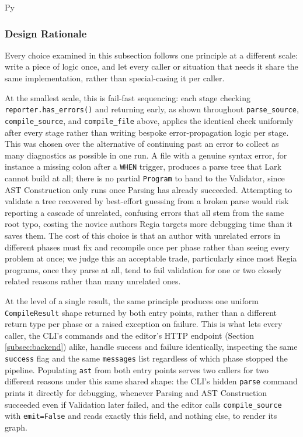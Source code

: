 \begin{codeblock}[]{Py}
\subsubsection{Design Rationale}
Every choice examined in this subsection follows one principle at a different scale: write a piece of logic once, and let every caller or situation that needs it share the same implementation, rather than special-casing it per caller.

At the smallest scale, this is fail-fast sequencing: each stage checking \lstinline|reporter.has_errors()| and returning early, as shown throughout \lstinline|parse_source|, \lstinline|compile_source|, and \lstinline|compile_file| above, applies the identical check uniformly after every stage rather than writing bespoke error-propagation logic per stage. This was chosen over the alternative of continuing past an error to collect as many diagnostics as possible in one run. A file with a genuine syntax error, for instance a missing colon after a \lstinline|WHEN| trigger, produces a parse tree that Lark cannot build at all; there is no partial \lstinline|Program| to hand to the Validator, since AST Construction only runs once Parsing has already succeeded. Attempting to validate a tree recovered by best-effort guessing from a broken parse would risk reporting a cascade of unrelated, confusing errors that all stem from the same root typo, costing the novice authors Regia targets more debugging time than it saves them. The cost of this choice is that an author with unrelated errors in different phases must fix and recompile once per phase rather than seeing every problem at once; we judge this an acceptable trade, particularly since most Regia programs, once they parse at all, tend to fail validation for one or two closely related reasons rather than many unrelated ones.

At the level of a single result, the same principle produces one uniform \lstinline|CompileResult| shape returned by both entry points, rather than a different return type per phase or a raised exception on failure. This is what lets every caller, the CLI's commands and the editor's HTTP endpoint (Section \ref{subsec:backend}) alike, handle success and failure identically, inspecting the same \lstinline|success| flag and the same \lstinline|messages| list regardless of which phase stopped the pipeline. Populating \lstinline|ast| from both entry points serves two callers for two different reasons under this same shared shape: the CLI's hidden \lstinline|parse| command prints it directly for debugging, whenever Parsing and AST Construction succeeded even if Validation later failed, and the editor calls \lstinline|compile_source| with \lstinline|emit=False| and reads exactly this field, and nothing else, to render its graph.


\end{codeblock}
